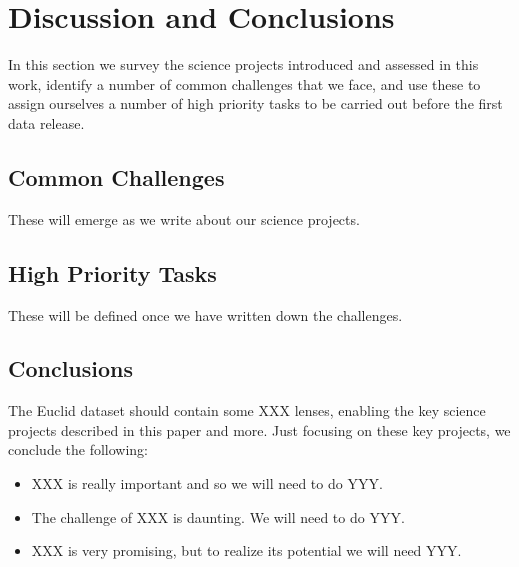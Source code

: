 \documentclass[twocolumn]{svjour3}
\begin{document}



\vspace{30pt}



\section{Discussion and Conclusions}
\label{sec:conclusions}

In this section we survey the science projects introduced and assessed
in this  work, identify a number of common challenges that we face, and
use these to  assign ourselves a number of high priority tasks to be
carried out before the first data release.

\subsection{Common Challenges}

These will emerge as we write about our science projects.


\subsection{High Priority Tasks}

These will be defined once we have written down the challenges.


\subsection{Conclusions}

The Euclid dataset should contain some XXX lenses, enabling the key
science projects described in this paper and more. Just focusing on
these key projects, we conclude the following:

\begin{itemize}

\item XXX is really important and so we will need to do YYY.

\item The challenge of XXX is daunting. We will need to do YYY.

\item XXX is very promising, but to realize its potential we will need
YYY.

\end{itemize}
\end{document}

